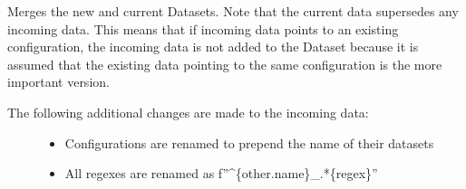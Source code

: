 \documentclass[letterpaper,10pt,english]{sphinxmanual}
\begin{document}
\begin{fulllineitems}

\begin{fulllineitems}
\label{\detokenize{dataset:colabfit.tools.dataset.Dataset.issubset}}
\end{fulllineitems}


\begin{fulllineitems}
\label{\detokenize{dataset:colabfit.tools.dataset.Dataset.issuperset}}
\end{fulllineitems}


\begin{fulllineitems}
\label{\detokenize{dataset:colabfit.tools.dataset.Dataset.merge}}
\sphinxAtStartPar
Merges the new and current Datasets. Note that the current data
supersedes any incoming data. This means that if incoming data points
to an existing configuration, the incoming data is not added to the
Dataset because it is assumed that the existing data pointing to the
same configuration is the more important version.
\begin{description}
\item[{The following additional changes are made to the incoming data:}] \leavevmode\begin{itemize}
\item {} 
\sphinxAtStartPar
Configurations are renamed to prepend the name of their datasets

\item {} 
\sphinxAtStartPar
All regexes are renamed as f”\textasciicircum{}\{other.name\}\_.*\{regex\}”

\end{itemize}


\end{description}
\end{fulllineitems}
\end{fulllineitems}
\end{document}
